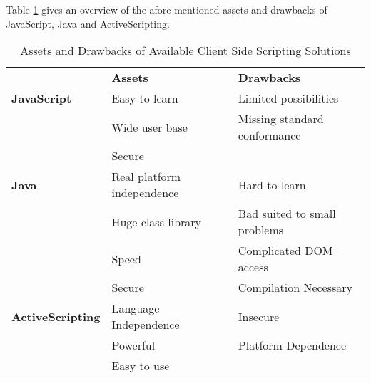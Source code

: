 Table \ref{tab:AssetsAndDrawbacksOfAvailableClientSideScriptingSolutions} gives an overview of the afore mentioned assets and drawbacks of JavaScript, Java and ActiveScripting.

\begin{table}[hb]
	\centering
		\begin{tabular}{lll}
		 & \textbf{Assets} & \textbf{Drawbacks} \\
		 \textbf{JavaScript} & Easy to learn & Limited possibilities \\
		 		& Wide user base & Missing standard conformance \\
		 		& Secure & \\
		 \textbf{Java} & Real platform independence & Hard to learn \\
		 		& Huge class library & Bad suited to small problems \\
		 		& Speed & Complicated DOM access \\
		 		& Secure & Compilation Necessary \\
		 \textbf{ActiveScripting} & Language Independence & Insecure \\
		 		& Powerful & Platform Dependence \\
		 		& Easy to use & \\
		\end{tabular}
	\caption{Assets and Drawbacks of Available Client Side Scripting Solutions}
	\label{tab:AssetsAndDrawbacksOfAvailableClientSideScriptingSolutions}
\end{table}